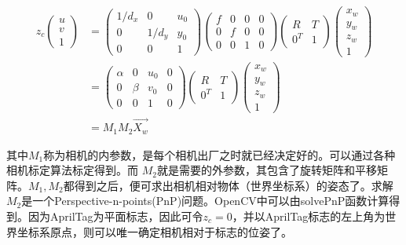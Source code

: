 \begin{equation} 
\begin{split}
    z_c\begin{pmatrix}
u \\
v \\
1    \end{pmatrix} &= \begin{pmatrix}
1/d_x & 0 & u_0\\
0 & 1/d_y & y_0\\
0 & 0 & 1\end{pmatrix}
\begin{pmatrix}
f & 0 & 0 & 0 \\
0 & f & 0 & 0 \\
0 & 0 & 1 & 0 \end{pmatrix}
\begin{pmatrix}
R & T \\
0^T & 1 \end{pmatrix}
\begin{pmatrix}
x_w \\
y_w \\
z_w \\
1    \end{pmatrix} \\
&=\begin{pmatrix}
\alpha & 0 & u_0 & 0 \\
0 & \beta & v_0 & 0 \\
0 & 0 & 1 & 0 \end{pmatrix}
\begin{pmatrix}
R & T \\
0^T & 1 \end{pmatrix}
\begin{pmatrix}
x_w \\
y_w \\
z_w \\
1    \end{pmatrix} \\
&= M_1M_2\overrightarrow{X_w}
\end{split}
\end{equation}

其中$M_1$称为相机的内参数，是每个相机出厂之时就已经决定好的。可以通过各种相机标定算法标定得到。而 $M_2$就是需要的外参数，其包含了旋转矩阵和平移矩阵。$M_1,M_2$都得到之后，便可求出相机相对物体（世界坐标系）的姿态了。求解$M_2$是一个Perspective-n-points(PnP)问题。OpenCV中可以由solvePnP函数计算得到。因为AprilTag为平面标志，因此可令$z_c=0$，并以AprilTag标志的左上角为世界坐标系原点，则可以唯一确定相机相对于标志的位姿了。

